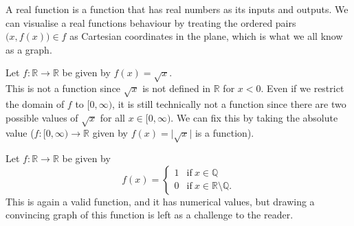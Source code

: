 \documentclass[../real_analysis.tex]{subfiles}
\begin{document}
        A real function is a function that has real numbers as its inputs and outputs. We can visualise a real functions behaviour by treating the ordered pairs $\big(x, f(x)\big) \in f$ as Cartesian coordinates in the plane, which is what we all know as a graph.
        \begin{example}
            Let $f: \mathbb{R} \to \mathbb{R}$ be given by $f(x) = \sqrt{x}$. \\
            This is not a function since $\sqrt{x}$ is not defined in $\mathbb{R}$ for $x<0$. Even if we restrict the domain of $f$ to $[0, \infty)$, it is still technically not a function since there are two possible values of $\sqrt{x}$ for all $x \in [0, \infty)$. We can fix this by taking the absolute value ($f: [0, \infty) \to \mathbb{R}$ given by $f(x) = \lvert\sqrt{x}\rvert$ is a function).
        \end{example}
        \begin{example}
            Let $f: \mathbb{R} \to \mathbb{R}$ be given by
            \[f(x) = \begin{cases}
                        1 & \text{if}\ x \in \mathbb{Q} \\
                        0 & \text{if}\ x \in \mathbb{R}\setminus\mathbb{Q}.
                    \end{cases}\]
            This is again a valid function, and it has numerical values, but drawing a convincing graph of this function is left as a challenge to the reader.
        \end{example}
\end{document}
